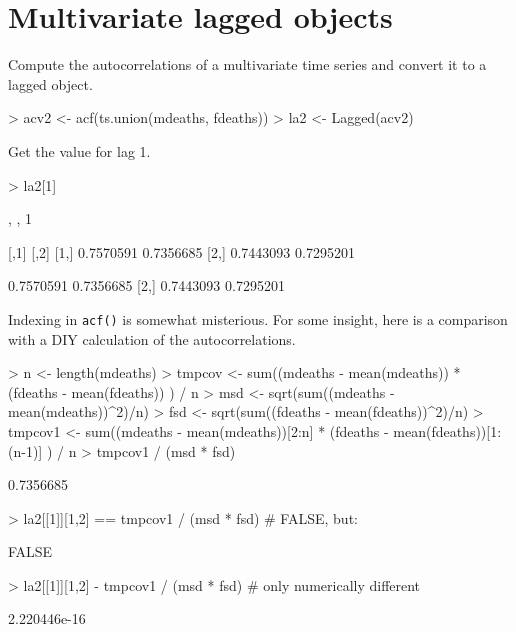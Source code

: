 \documentclass[a4paper,twoside,11pt,nojss,article]{jss}
\begin{document}
\section{Multivariate lagged objects}
\label{sec:org4e80c18}

Compute the autocorrelations of a multivariate time series and convert it to a lagged object.
\begin{Schunk}
\begin{Sinput}
> acv2 <- acf(ts.union(mdeaths, fdeaths))
> la2 <- Lagged(acv2)
\end{Sinput}
\end{Schunk}

Get the value for lag 1.
\begin{Schunk}
\begin{Sinput}
> la2[1]
\end{Sinput}
\begin{Soutput}
, , 1

          [,1]      [,2]
[1,] 0.7570591 0.7356685
[2,] 0.7443093 0.7295201
\end{Soutput}
\begin{Soutput}
          [,1]      [,2]
[1,] 0.7570591 0.7356685
[2,] 0.7443093 0.7295201
\end{Soutput}
\end{Schunk}

Indexing in \texttt{acf()} is somewhat misterious. For some insight, here is a comparison with a DIY
calculation of the autocorrelations.
\begin{Schunk}
\begin{Sinput}
> n <- length(mdeaths)
> tmpcov <- sum((mdeaths - mean(mdeaths)) * (fdeaths - mean(fdeaths)) ) / n
> msd <- sqrt(sum((mdeaths - mean(mdeaths))^2)/n)
> fsd <- sqrt(sum((fdeaths - mean(fdeaths))^2)/n)
> tmpcov1 <- sum((mdeaths - mean(mdeaths))[2:n] * (fdeaths - mean(fdeaths))[1:(n-1)] ) / n
> tmpcov1 / (msd * fsd)
\end{Sinput}
\begin{Soutput}
[1] 0.7356685
\end{Soutput}
\begin{Sinput}
> la2[[1]][1,2] == tmpcov1 / (msd * fsd) # FALSE, but:
\end{Sinput}
\begin{Soutput}
[1] FALSE
\end{Soutput}
\begin{Sinput}
> la2[[1]][1,2] - tmpcov1 / (msd * fsd)  # only numerically different
\end{Sinput}
\begin{Soutput}
[1] 2.220446e-16
\end{Soutput}
\end{Schunk}
\end{document}

